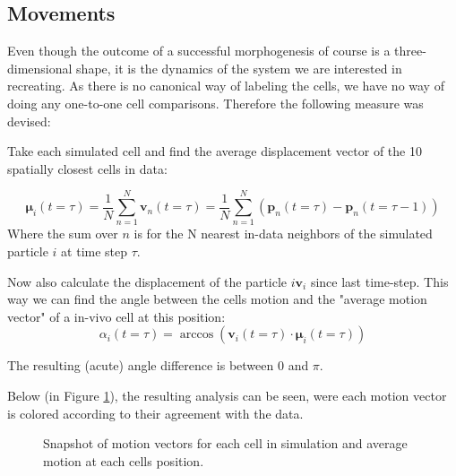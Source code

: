 \subsection{Movements}

Even though the outcome of a successful morphogenesis of course is a three-dimensional shape, it is the dynamics of the system we are interested in recreating. As there is no canonical way of labeling the cells, we have no way of doing any one-to-one cell comparisons. Therefore the following measure was devised: 

Take each simulated cell and find the average displacement vector of the 10 spatially closest cells in data:

\begin{equation}
    \boldsymbol{\mu}_i(t=\tau) = \frac{1}{N} \sum_{n=1}^{N}\boldsymbol{v}_n(t=\tau)= \frac{1}{N}\sum_{n=1}^{N}\left(\boldsymbol{p}_n(t=\tau) - \boldsymbol{p}_n(t=\tau-1) \right)
\end{equation}
Where the sum over $n$ is for the N nearest in-data neighbors of the simulated particle $i$ at time step $\tau$.

Now also calculate the displacement of the particle $i$$\boldsymbol{v}_i$ since last time-step. This way we can find the angle between the cells motion and the "average motion vector" of a in-vivo cell at this position:
\begin{equation}
    \alpha_i(t=\tau) = \arccos\left(\boldsymbol{v}_i(t=\tau)\cdot\boldsymbol{\mu}_i(t=\tau)\right)
\end{equation}

The resulting (acute) angle difference is between 0 and $\pi$. 

Below (in Figure  \ref{fig:motionAgreementExample}), the resulting analysis can be seen, were each motion vector is colored according to their agreement with the data.

\begin{figure}[H]
    \centering
    \caption{Snapshot of motion vectors for each cell in simulation and average motion at each cells position. }
    \label{fig:motionAgreementExample}
\end{figure}


